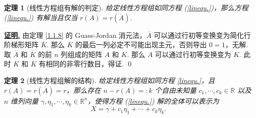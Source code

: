 \documentclass[10pt,openany]{article}
\theoremstyle{thmstyle} %
\newtheorem{theorem}{定理}[subsection]
\theoremstyle{defstyle} %
\theoremstyle{prostyle} %
\renewenvironment{proof}[1][证明]{\par\underline{\textbf{#1.}} \;\fangsong}{\qed\par}
\begin{document}
\begin{theorem}[线性方程组有解的判定]
	给定线性方程组如同方程 (\ref{linequ.})，那么方程 (\ref{linequ.}) 有解当且仅当 \( r(A)=r(\overline{A}) \).
	\label{1.1.12}
\end{theorem}

\begin{proof}
	由定理 \ref{1.1.8} 的 Guass-Jordan 消元法，\( \overline{A} \) 可以通过行初等变换变为简化行阶梯形矩阵 \( \overline{K} \). 那么 \( \overline{K} \) 的最后一列必定不可能出现主元，否则导出 \( 0=1 \)，无解. 取 \( \overline{A} \) 和 \( \overline{K} \) 的前 \( n \) 列组成的矩阵 \( A \) 和 \( K \). 那么 \( A \) 可以通过行初等变换变为 \( K \). 此时 \( K \) 和 \( \overline{K} \) 有相同的非零行数目，得证.
\end{proof}

\begin{theorem}[线性方程组解的结构]
	给定线性方程组如同方程 \ref{linequ.}，且 \( r(A)=r(\overline{A})=r \)，那么存在 \( n-r(A)=:k \) 个自由未知量 \( c_1,\cdots,c_{k} \in \mathbb{R} \) 以及 \( n \) 维列向量 \( \gamma,\eta_1,\cdots,\eta_k \in \mathbb{R}^n \)，使得方程 (\ref{linequ.}) 解的全体可以表示为
	\[ X=\gamma+c_1\eta_1+\cdots+c_k\eta_k. \] 
	\label{1.1.13}
\end{theorem}
\end{document}
